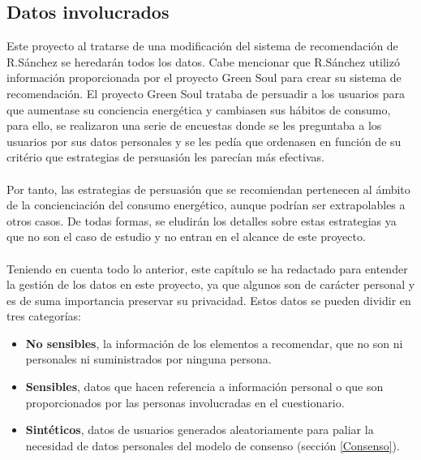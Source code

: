 \subsection{Datos involucrados}
Este proyecto al tratarse de una modificación del sistema de recomendación de R.Sánchez se heredarán todos los datos. Cabe mencionar que R.Sánchez utilizó información proporcionada por el proyecto Green Soul\autocite{EcoawarePersuasiveNetworked} para crear su sistema de recomendación. El proyecto Green Soul trataba de persuadir a los usuarios para que aumentase su conciencia energética y cambiasen sus hábitos de consumo, para ello, se realizaron una serie de encuestas donde se les preguntaba a los usuarios por sus datos personales y se les pedía que ordenasen en función de su critério que estrategias de persuasión les parecían más efectivas.
\\ \\
Por tanto, las estrategias de persuasión que se recomiendan pertenecen al ámbito de la concienciación del consumo energético, aunque podrían ser extrapolables a otros casos. De todas formas, se eludirán los detalles sobre estas estrategias ya que no son el caso de estudio y no entran en el alcance de este proyecto.
\\ \\
Teniendo en cuenta todo lo anterior, este capítulo se ha redactado para entender la gestión de los datos en este proyecto, ya que algunos son de carácter personal y es de suma importancia preservar su privacidad. Estos datos se pueden dividir en tres categorías:
\begin{itemize}
    \item \textbf{No sensibles}, la información de los elementos a recomendar, que no son ni personales ni suministrados por ninguna persona.
    \item  \textbf{Sensibles}, datos que hacen referencia a información personal o que son proporcionados por las personas involucradas en el cuestionario.
    \item \textbf{Sintéticos}, datos de usuarios generados aleatoriamente para paliar la necesidad de datos personales del modelo de consenso (sección \ref{Consenso}).
\end{itemize} 

